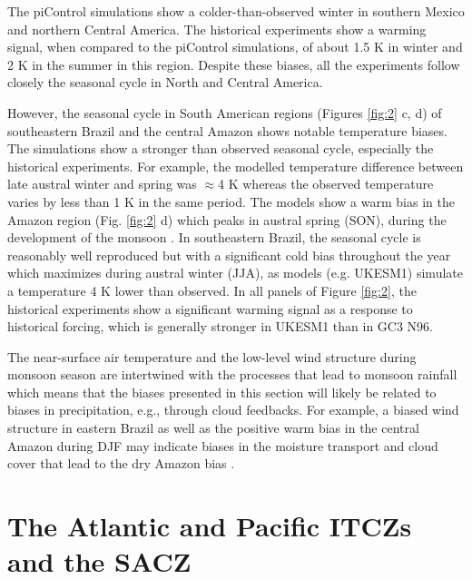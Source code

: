 The piControl simulations show a colder-than-observed winter in southern Mexico and northern Central America. The historical experiments show a warming signal, when compared to the piControl simulations, of about 1.5 K in winter and 2 K in the summer in this region. Despite these biases, all the experiments follow closely the seasonal cycle in North and Central America.

However, the seasonal cycle in South American regions (Figures \ref{fig:2} c, d) of southeastern Brazil and the central Amazon shows notable temperature biases.
The simulations show a stronger than observed seasonal cycle, especially the historical experiments. For example, the modelled temperature difference between late austral winter and spring was $\approx$4 K whereas the observed temperature varies by less than 1 K in the same period. The models show a warm bias in the Amazon region (Fig. \ref{fig:2} d) which peaks in austral spring (SON), during the development of the monsoon \citep{marengo2012}.
In southeastern Brazil, the seasonal cycle is reasonably well reproduced but with a significant cold bias throughout the year which maximizes during austral winter (JJA), as models (e.g. UKESM1) simulate  a temperature 4 K lower than observed.
In all panels of Figure \ref{fig:2}, the historical experiments show a significant warming signal as a response to historical forcing, which is generally stronger in UKESM1 than in GC3 N96. 


The near-surface air temperature and the low-level wind structure during monsoon season are intertwined with the processes that lead to monsoon rainfall which means that the biases presented in this section will likely be related to biases in precipitation, e.g., through cloud feedbacks. For example, a biased wind structure in eastern Brazil as well as the positive warm bias in the central Amazon during DJF may indicate biases in the moisture transport and cloud cover that lead to the dry Amazon bias \citep{jones2013}. %

\section{The Atlantic and Pacific ITCZs and the SACZ}\label{sq:itcz}



